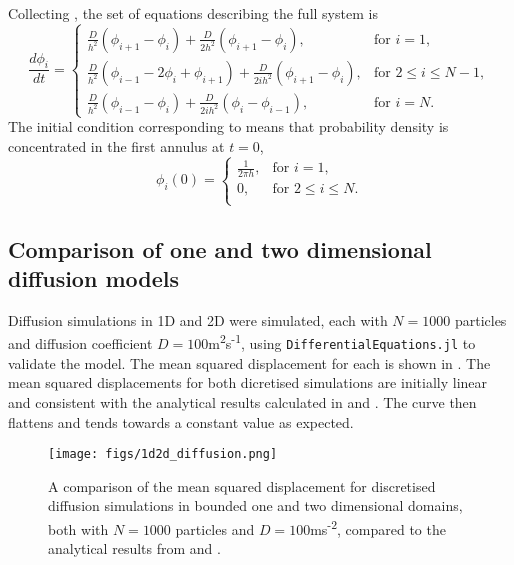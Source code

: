 Collecting , the set of equations describing the full system is
%
  \begin{equation}
  \frac{d\phi_i}{dt} = \begin{cases}
  		\frac{D}{h^2}(\phi_{i+1} - \phi_{i}) + \frac{D}{2h^2} (\phi_{i+1}-\phi_i), & \text{for } i = 1, \\
  		\frac{D}{h^2}(\phi_{i-1}-2\phi_i +\phi_{i+1}) + \frac{D}{2ih^2} (\phi_{i+1}-\phi_{i}), & \text{for } 2 \leq i \leq N-1, \\
  		\frac{D}{h^2}(\phi_{i-1}-\phi_i) + \frac{D}{2ih^2} (\phi_{i}-\phi_{i-1}), & \text{for } i = N .
  		\end{cases}
          \label{eqn:discrete_diffusion2d}
  \end{equation}
 The initial condition corresponding to  means that probability density is concentrated in the first annulus at $t=0$,
%
\begin{equation}
\phi_i(0) = \begin{cases}
       \frac{1}{2\pi h}, & \text{for } i = 1, \\
       0, & \text{for } 2 \leq i \leq N. \\
       \end{cases}
        \label{eqn:discrete_diffusion_IC}
\end{equation}
%
%
\subsection{Comparison of one and two dimensional diffusion models}
%
Diffusion simulations in 1D and 2D were simulated, each with $N=1000$ particles and diffusion coefficient $D=100$m\textsuperscript{2}s\textsuperscript{-1}, using \texttt{DifferentialEquations.jl} \cite{DifferentialEquations} to validate the model. The mean squared displacement for each is shown in . The mean squared displacements for both dicretised simulations are initially linear and consistent with the analytical results calculated in  and . The curve then flattens and tends towards a constant value as expected.
%
\begin{figure}
\centering
    \texttt{[image: figs/1d2d\_diffusion.png]}
    \caption{A comparison of the mean squared displacement for discretised diffusion simulations in bounded one and two dimensional domains, both with $N=1000$ particles and $D=100$ms\textsuperscript{-2}, compared to the analytical results from  and .}
\label{fig:1d2d_diffusion}
\end{figure}
%
